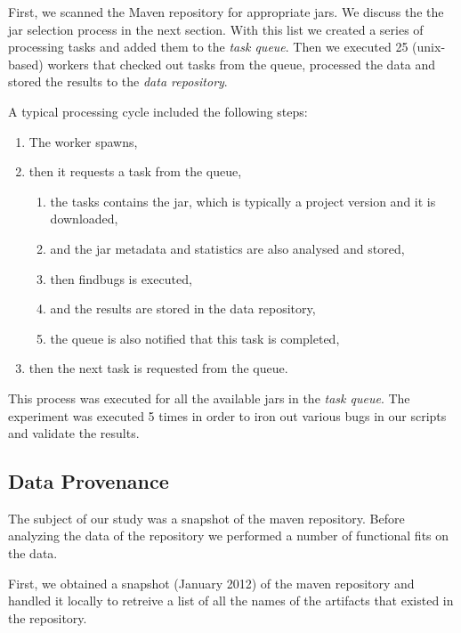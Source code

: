 \documentclass[conference]{IEEEtran}
\begin{document}
First, we scanned the Maven repository for appropriate jars. We discuss the the jar selection process in the next 
section. With this list we created a series of processing tasks and added them to the \textit{task queue}. Then we
executed 25 (unix-based) workers that checked out tasks from the queue, processed the data and stored the results to the \textit{data repository}.

A typical processing cycle included the following steps:

\begin{enumerate}
	\item The worker spawns,
	\item then it requests a task from the queue,
	\begin{enumerate}
		\item the tasks contains the {\sc jar}, which is typically a project version and it is downloaded,
		\item and the {\sc jar} metadata and statistics are also analysed and stored,
		\item then findbugs is executed,
		\item and the results are stored in the data repository,
		\item the queue is also notified that this task is completed,
	\end{enumerate}
	\item then the next task is requested from the queue.
\end{enumerate}

This process was executed for all the available {\sc jar}s in the \textit{task queue}. The experiment was executed 5 times in order to iron out various bugs in our scripts and validate the results. 

\subsection{Data Provenance}
\label{sec:data}

The subject of our study was a snapshot of the maven repository. Before
analyzing the data of the repository we performed a number of functional fits
on the data.

First, we obtained a snapshot (January 2012) of the maven repository and
handled it locally to retreive a list of all the names of the artifacts that existed in the
repository.
\end{document}
